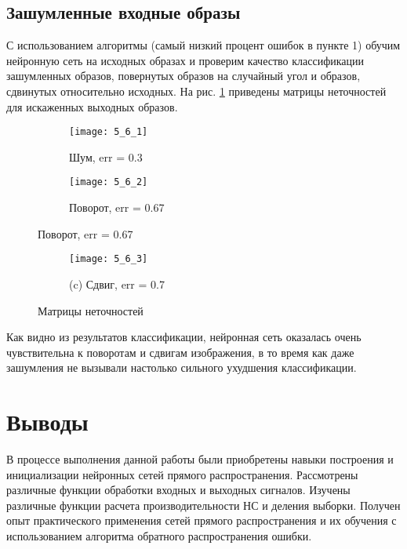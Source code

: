 \subsection{Зашумленные входные образы}

С использованием алгоритмы  (самый низкий процент ошибок в пункте 1) обучим нейронную сеть на исходных образах и проверим качество классификации зашумленных образов, повернутых образов на случайный угол и образов, сдвинутых относительно исходных. На рис. \ref{fig:5_6_1} приведены матрицы неточностей для искаженных выходных образов.
\vspace{-0.3cm}
\begin{figure}[H]
\begin{center}
	\begin{subfigure}[b]{0.47\textwidth}
		\texttt{[image: 5\_6\_1]}
		\caption{Шум, err = 0.3}
	\end{subfigure}
	\begin{subfigure}[b]{0.47\textwidth}
		\texttt{[image: 5\_6\_2]}
		\caption{Поворот, err = 0.67}
	\end{subfigure}
\end{center}
\end{figure}
\begin{figure}[H]
\begin{center}
	\begin{subfigure}[b]{0.49\textwidth}
		\texttt{[image: 5\_6\_3]}
		\caption*{(c) Сдвиг, err = 0.7}
	\end{subfigure}
	\caption{Матрицы неточностей}
	\label{fig:5_6_1}
\end{center}
\end{figure}

Как видно из результатов классификации, нейронная сеть оказалась очень чувствительна к поворотам и сдвигам изображения, в то время как даже зашумления не вызывали настолько сильного ухудшения классификации. 

\section{Выводы}

В процессе выполнения данной работы были приобретены навыки построения и инициализации нейронных сетей прямого распространения. Рассмотрены различные функции обработки входных и выходных сигналов. Изучены различные функции расчета производительности НС и деления выборки. Получен опыт практического применения сетей прямого распространения и их обучения с использованием алгоритма обратного распространения ошибки.

